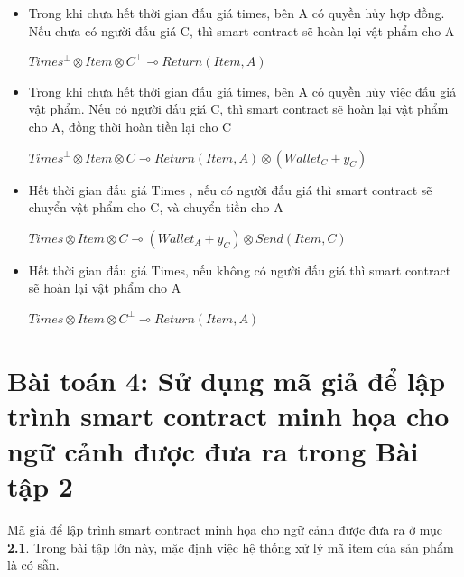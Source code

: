 \documentclass[a4paper]{article}
\begin{document}
\begin{itemize}
    \item Trong khi chưa hết thời gian đấu giá times, bên A có quyền hủy hợp đồng. Nếu chưa có người đấu giá C, thì smart contract sẽ hoàn lại vật phẩm cho A
    \begin{center}
        $Times^{\bot} \otimes Item \otimes C^{\bot} \multimap Return(Item,A)$
    \end{center}
    
    \item Trong khi chưa hết thời gian đấu giá times, bên A có quyền hủy việc đấu giá vật phẩm. Nếu có người đấu giá C, thì smart contract sẽ hoàn lại vật phẩm cho A, đồng thời hoàn tiền lại cho C\\
    \begin{center}
        $Times^{\bot} \otimes Item \otimes C \multimap Return(Item, A) \otimes (Wallet_{C} + y_{C})$ 
    \end{center}
    
    \item Hết thời gian đấu giá Times , nếu có người đấu giá thì smart contract sẽ chuyển vật phẩm cho C, và chuyển tiền cho A\\
    \begin{center}
        $Times \otimes Item \otimes C \multimap (Wallet_{A} + y_{C}) \otimes Send(Item,C)$
    \end{center}
    
    \item Hết thời gian đấu giá Times, nếu không có người đấu giá thì smart contract sẽ hoàn lại vật phẩm cho A\\
    \begin{center}
        $Times \otimes Item \otimes C^{\bot} \multimap Return(Item,A)$
    \end{center}
\end{itemize}

\section{Bài toán 4: Sử dụng mã giả để lập trình smart contract minh họa cho ngữ cảnh được đưa ra
trong Bài tập 2}
Mã giả để lập trình smart contract minh họa cho ngữ cảnh được đưa ra ở mục \textbf{2.1}. Trong bài tập lớn này, mặc định việc hệ thống xử lý mã item của sản phẩm là có sẵn.\\
\end{document}
